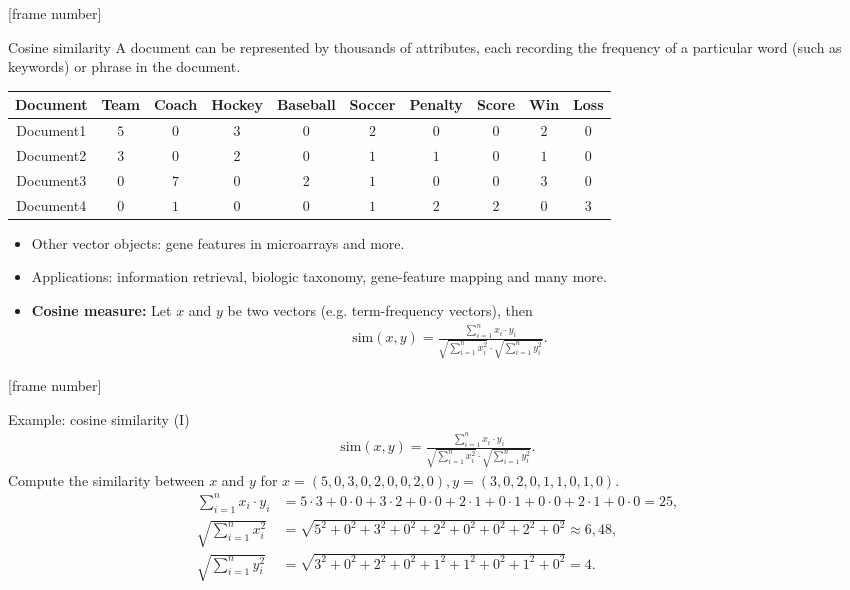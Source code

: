 \documentclass[aspectratio=169,t]{beamer}
\begin{document}
  {
    [frame number]
    \begin{frame}{Cosine similarity}
    A document can be represented by thousands of attributes, each recording the frequency of a particular word (such as keywords) or phrase in the document.\\[0.2cm]
    \begin{tabular}{|c|c|c|c|c|c|c|c|c|c|}
    \hline
    Document & Team & Coach & Hockey & Baseball & Soccer & Penalty & Score & Win & Loss \\\hline
    Document1 & $5$ & $0$ & $3$ & $0$ & $2$ & $0$ & $0$ & $2$ & $0$ \\
    Document2 & $3$ & $0$ & $2$ & $0$ & $1$ & $1$ & $0$ & $1$ & $0$ \\
    Document3 & $0$ & $7$ & $0$ & $2$ & $1$ & $0$ & $0$ & $3$ & $0$ \\
    Document4 & $0$ & $1$ & $0$ & $0$ & $1$ & $2$ & $2$ & $0$ & $3$ \\
    \hline
    \end{tabular}
    \begin{itemize}
      \item Other vector objects: gene features in microarrays and more.
      \item Applications: information retrieval, biologic taxonomy, gene-feature mapping and many more.
      \item \textbf{Cosine measure:} Let $x$ and $y$ be two vectors (e.g. term-frequency vectors), then
      \begin{align}
        \text{sim}(x,y) = \frac{\sum_{i=1}^{n} x_i \cdot y_i}{\sqrt{\sum_{i=1}^{n}x_i^2}\cdot \sqrt{\sum_{i=1}^{n} y_i^2}}.
      \end{align}
    \end{itemize}
    \end{frame}
  }

  {
    [frame number]
    \begin{frame}{Example: cosine similarity (I)}
    \begin{align}
      \text{sim}(x,y) = \frac{\sum_{i=1}^{n} x_i \cdot y_i}{\sqrt{\sum_{i=1}^{n}x_i^2}\cdot \sqrt{\sum_{i=1}^{n} y_i^2}}.
    \end{align}
    Compute the similarity between $x$ and $y$ for $x = (5,0,3,0,2,0,0,2,0), y = (3,0,2,0,1,1,0,1,0).$
    \begin{align}
      \sum_{i=1}^{n} x_i \cdot y_i &= 5 \cdot 3 + 0 \cdot 0 + 3 \cdot 2 + 0 \cdot 0 + 2 \cdot 1 + 0 \cdot 1 + 0 \cdot 0 + 2 \cdot 1 + 0 \cdot 0 = 25,\\
      \sqrt{\sum_{i=1}^{n}x_i^2} &= \sqrt{5^2 + 0^2 + 3^2 + 0^2 + 2^2 + 0^2 + 0^2 + 2^2 + 0^2} \approx 6,48,\\
      \sqrt{\sum_{i=1}^{n}y_i^2} &= \sqrt{3^2 + 0^2 + 2^2 + 0^2 + 1^2 + 1^2 + 0^2 + 1^2 + 0^2} = 4.\\
    \end{align}
    \end{frame}
  }
\end{document}

